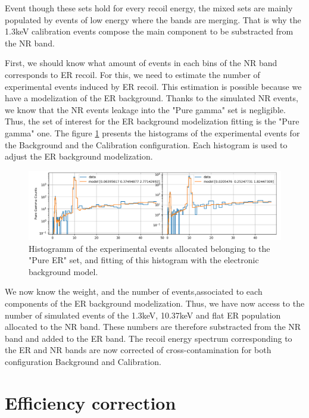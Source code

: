 Event though these sets hold for every recoil energy, the mixed sets are mainly populated by events of low energy where the bands are merging. That is why the 1.3keV calibration events compose the main component to be substracted from the NR band.

First, we should know what amount of events in each bins of the NR band corresponds to ER recoil. For this, we need to estimate the number of experimental events induced by ER recoil. This estimation is possible because we have a modelization of the ER background. Thanks to the simulated NR events, we know that the NR events leakage into the "Pure gamma" set is negligible. Thus, the set of interest for the ER background modelization fitting is the "Pure gamma" one. The figure \ref{fig:er-components-fitting} presents the histograms of the experimental events for the Background and the Calibration configuration. Each histogram is used to adjust the ER background modelization. 

\begin{figure}
\centering
\includegraphics[width=\linewidth,]{Figures/Neutron/er_components_fitting.png}
\caption{Histogramm of the experimental events allocated belonging to the "Pure ER" set, and fitting of this histogram with the electronic background model.}
\label{fig:er-components-fitting}
\end{figure}

We now know the weight, and the number of events,associated to each components of the ER background modelization. Thus, we have now access to the number of simulated events of the 1.3keV, 10.37keV and flat ER population allocated to the NR band. These numbers are therefore substracted from the NR band and added to the ER band. The recoil energy spectrum corresponding to the ER and NR bands are now corrected of cross-contamination for both configuration Background and Calibration.


\section{Efficiency correction}
\label{par:efficiency}

